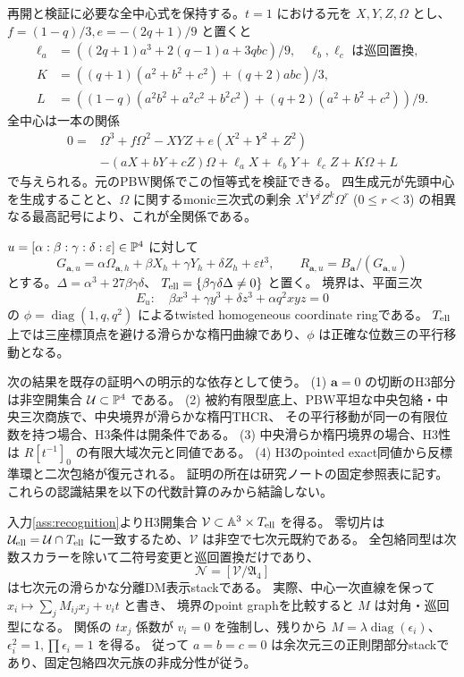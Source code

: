 再開と検証に必要な全中心式を保持する。$t=1$ における元を $X,Y,Z,\Omega$ とし、
$f=(1-q)/3,e=-(2q+1)/9$ と置くと
\begin{align*}
\ell_a&=((2q+1)a^3+2(q-1)a+3qbc)/9,\quad \ell_b,\ell_c\text{ は巡回置換},\\
K&=((q+1)(a^2+b^2+c^2)+(q+2)abc)/3,\\
L&=((1-q)(a^2b^2+a^2c^2+b^2c^2)+(q+2)(a^2+b^2+c^2))/9.
\end{align*}
全中心は一本の関係
\begin{equation}\label{eq:center}
\begin{split}
0={}&\Omega^3+f\Omega^2-XYZ+e(X^2+Y^2+Z^2)\\
&-(aX+bY+cZ)\Omega+\ell_aX+\ell_bY+\ell_cZ+K\Omega+L
\end{split}
\end{equation}
で与えられる。元のPBW関係でこの恒等式を検証できる。
四生成元が先頭中心を生成することと、$\Omega$ に関するmonic三次式の剰余
$X^iY^jZ^k\Omega^r$ ($0\le r<3$) の相異なる最高記号により、これが全関係である。

$u=[\alpha:\beta:\gamma:\delta:\varepsilon]\in\PP^4$ に対して
\[
G_{\mathbf a,u}=\alpha\Omega_{\mathbf a,h}+\beta X_h+\gamma Y_h+\delta Z_h+\varepsilon t^3,
\qquad R_{\mathbf a,u}=B_{\mathbf a}/(G_{\mathbf a,u})
\]
とする。$\Delta=\alpha^3+27\beta\gamma\delta$、
$T_{\rm ell}=\{\beta\gamma\delta\Delta\ne0\}$ と置く。
境界は、平面三次
\[
E_u:\quad \beta x^3+\gamma y^3+\delta z^3+\alpha q^2xyz=0
\]
の $\phi=\operatorname{diag}(1,q,q^2)$ によるtwisted homogeneous coordinate ringである。
$T_{\rm ell}$ 上では三座標頂点を避ける滑らかな楕円曲線であり、$\phi$ は正確な位数三の平行移動となる。

\begin{assumption}\label{ass:recognition}
次の結果を既存の証明への明示的な依存として使う。
(1) $\mathbf a=0$ の切断のH3部分は非空開集合 $\mathcal U\subset\PP^4$ である。
(2) 被約有限型底上、PBW平坦な中央包絡・中央三次商族で、中央境界が滑らかな楕円THCR、
その平行移動が同一の有限位数を持つ場合、H3条件は開条件である。
(3) 中央滑らか楕円境界の場合、H3性は $R[t^{-1}]_0$ の有限大域次元と同値である。
(4) H3のpointed exact同値から反標準環と二次包絡が復元される。
証明の所在は研究ノートの固定参照表に記す。これらの認識結果を以下の代数計算のみから結論しない。
\end{assumption}

入力\ref{ass:recognition}よりH3開集合 $\mathcal V\subset\AA^3\times T_{\rm ell}$ を得る。
零切片は $\mathcal U_{\rm ell}=\mathcal U\cap T_{\rm ell}$ に一致するため、$\mathcal V$ は非空で七次元既約である。
全包絡同型は次数スカラーを除いて二符号変更と巡回置換だけであり、
\begin{equation}\label{eq:N}
\mathcal N=[\mathcal V/\mathfrak A_4]
\end{equation}
は七次元の滑らかな分離DM表示stackである。
実際、中心一次直線を保って $x_i\mapsto\sum_jM_{ij}x_j+v_it$ と書き、
境界のpoint graphを比較すると $M$ は対角・巡回型になる。
関係の $tx_j$ 係数が $v_i=0$ を強制し、残りから
$M=\lambda\operatorname{diag}(\epsilon_i)$、$\epsilon_i^2=1,\prod\epsilon_i=1$ を得る。
従って $a=b=c=0$ は余次元三の正則閉部分stackであり、固定包絡四次元族の非成分性が従う。

